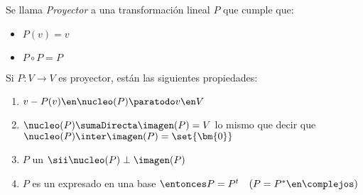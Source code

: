 \begin{enumerate}[label=\tiny\purple{\faIcon{snowman}}]
        Se llama  \textit{Proyector} a una transformación lineal $P$ que cumple que:
        \begin{itemize}
          \item $P(v) = v$
          \item $P \circ P = P$
        \end{itemize}
        Si $P: V \to V$ es proyector, están las siguientes propiedades:
        \begin{enumerate}[label=\poo]
          \item $v - P(v) \en \nucleo(P) \paratodo v \en V$
          \item  $ \nucleo(P) \sumaDirecta \imagen(P) = V$
                lo mismo que decir que
                $\nucleo(P) \inter \imagen(P) = \set{\bm{0}}$
          \item $P$ un \textit{}
                $\sii \nucleo(P) \perp \imagen(P)$
          \item $P$ es un \textit{} expresado en una base \textit{}
                $\entonces P = P^t \quad (P = P^* \en \complejos)$
        \end{enumerate}
\end{enumerate}
